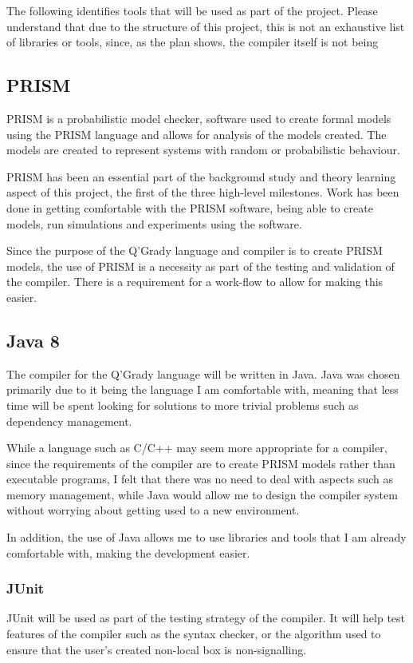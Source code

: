 \documentclass[11pt, a4paper]{article}
\begin{document}
The following identifies tools that will be used as part of the project. 
Please understand that due to the structure of this project, this is not an
exhaustive list of libraries or tools, since, as the plan shows, the compiler
itself is not being 

\subsection{PRISM}
\label{sub:prism}
PRISM is a probabilistic model checker, software used to create formal models
using the PRISM language and allows for analysis of the models created. The
models are created to represent systems with random or probabilistic behaviour.

PRISM has been an essential part of the background study and theory learning
aspect of this project, the first of the three high-level milestones. Work has
been done in getting comfortable with the PRISM software, being able to create
models, run simulations and experiments using the software.

Since the purpose of the Q'Grady language and compiler is to create PRISM
models, the use of PRISM is a necessity as part of the testing and validation of
the compiler. There is a requirement for a work-flow to allow for making this
easier.

\subsection{Java 8}
\label{sub:java_eight}
The compiler for the Q'Grady language will be written in Java. Java was chosen
primarily due to it being the language I am comfortable with, meaning that less
time will be spent looking for solutions to more trivial problems such as
dependency management.

While a language such as C/C++ may seem more appropriate for a compiler, since
the requirements of the compiler are to create PRISM models rather than
executable programs, I felt that there was no need to deal with aspects such as
memory management, while Java would allow me to design the compiler system
without worrying about getting used to a new environment.

In addition, the use of Java allows me to use libraries and tools that I am
already comfortable with, making the development easier.

\subsubsection{JUnit}
\label{sub:junit}
JUnit will be used as part of the testing strategy of the compiler. It will help
test features of the compiler such as the syntax checker, or the algorithm used
to ensure that the user's created non-local box is non-signalling.
\end{document}
